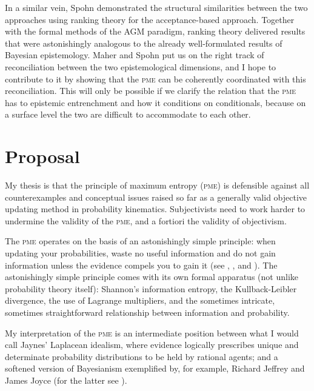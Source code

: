 \documentclass[11pt]{article}
\begin{document}
In a similar vein, Spohn demonstrated the structural similarities
between the two approaches using ranking theory for the
acceptance-based approach. Together with the formal methods of the AGM
paradigm, ranking theory delivered results that were astonishingly
analogous to the already well-formulated results of Bayesian
epistemology. Maher and Spohn put us on the right track of
reconciliation between the two epistemological dimensions, and I hope
to contribute to it by showing that the \textsc{pme} can be coherently
coordinated with this reconciliation. This will only be possible if we
clarify the relation that the \textsc{pme} has to epistemic
entrenchment and how it conditions on conditionals, because on a
surface level the two are difficult to accommodate to each other.

\section{Proposal}
\label{Proposal}

My thesis is that the principle of maximum entropy (\textsc{pme}) is
defensible against all counterexamples and conceptual issues raised so
far as a generally valid objective updating method in probability
kinematics. Subjectivists need to work harder to undermine the
validity of the \textsc{pme}, and a fortiori the validity of
objectivism.

The \textsc{pme} operates on the basis of an astonishingly simple
principle: when updating your probabilities, waste no useful
information and do not gain information unless the evidence compels
you to gain it (see ,
, and ). The
astonishingly simple principle comes with its own formal apparatus
(not unlike probability theory itself): Shannon's information entropy,
the Kullback-Leibler divergence, the use of Lagrange multipliers, and
the sometimes intricate, sometimes straightforward relationship
between information and probability.

My interpretation of the \textsc{pme} is an intermediate position
between what I would call Jaynes' Laplacean idealism, where evidence
logically prescribes unique and determinate probability distributions
to be held by rational agents; and a softened version of Bayesianism
exemplified by, for example, Richard Jeffrey and James Joyce (for the
latter see ). 
\end{document}

